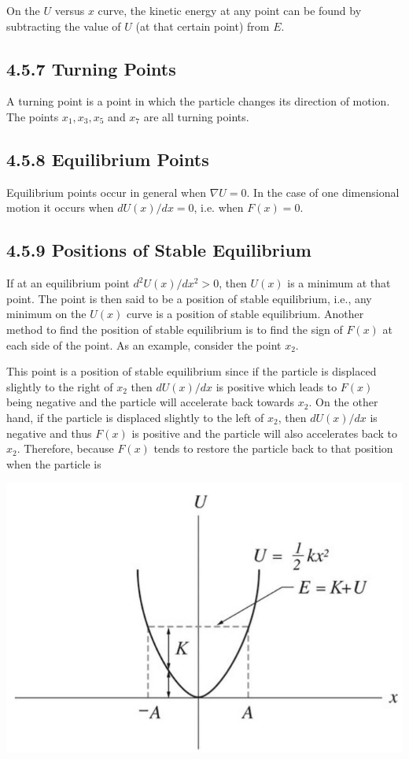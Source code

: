 \documentclass[10pt]{article}
\begin{document}
On the $U$ versus $x$ curve, the kinetic energy at any point can be found by subtracting the value of $U$ (at that certain point) from $E$.

\subsection*{4.5.7 Turning Points}
A turning point is a point in which the particle changes its direction of motion. The points $x_{1}, x_{3}, x_{5}$ and $x_{7}$ are all turning points.

\subsection*{4.5.8 Equilibrium Points}
Equilibrium points occur in general when $\nabla U=0$. In the case of one dimensional motion it occurs when $d U(x) / d x=0$, i.e. when $F(x)=0$.

\subsection*{4.5.9 Positions of Stable Equilibrium}
If at an equilibrium point $d^{2} U(x) / d x^{2}>0$, then $U(x)$ is a minimum at that point. The point is then said to be a position of stable equilibrium, i.e., any minimum on the $U(x)$ curve is a position of stable equilibrium. Another method to find the position of stable equilibrium is to find the sign of $F(x)$ at each side of the point. As an example, consider the point $x_{2}$.

This point is a position of stable equilibrium since if the particle is displaced slightly to the right of $x_{2}$ then $d U(x) / d x$ is positive which leads to $F(x)$ being negative and the particle will accelerate back towards $x_{2}$. On the other hand, if the particle is displaced slightly to the left of $x_{2}$, then $d U(x) / d x$ is negative and thus $F(x)$ is positive and the particle will also accelerates back to $x_{2}$. Therefore, because $F(x)$ tends to restore the particle back to that position when the particle is

\begin{center}
\includegraphics[max width=\textwidth]{2024_09_13_db1f357d2aad0a03eb2eg-078}
\end{center}
\end{document}
